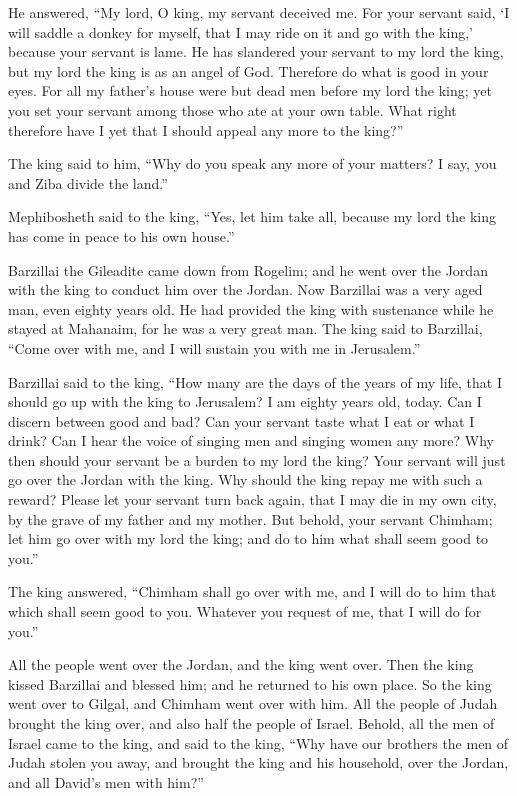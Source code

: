 \myverse{}He answered, “My lord, O king, my servant deceived me. For your
servant said, ‘I will saddle a donkey for myself, that I may ride on it and go with the king,’ because
your servant is lame.
\myverse{}He has slandered your servant to my lord the king, but my lord the king is
as an angel of God. Therefore do what is good in your eyes.
\myverse{}For all my father’s house were but dead men before my lord the king; yet
you set your servant among those who ate at your own table. What right therefore have I yet that I should
appeal any more to the king?”

\myverse{}The king said to him, “Why do you speak any more of your matters?
I say, you and Ziba divide the land.”

\myverse{}Mephibosheth said to the king, “Yes, let him take all, because
my lord the king has come in peace to his own house.”

\myverse{}Barzillai the Gileadite came down from Rogelim; and he went
over the Jordan with the king to conduct him over the Jordan.
\myverse{}Now Barzillai was a very aged man, even eighty years old. He had provided
the king with sustenance while he stayed at Mahanaim, for he was a very great man.
\myverse{}The king said to Barzillai, “Come over with me, and I will sustain you with
me in Jerusalem.”

\myverse{}Barzillai said to the king, “How many are the days of the years
of my life, that I should go up with the king to Jerusalem?
\myverse{}I am eighty years old, today. Can I discern between good and bad? Can your
servant taste what I eat or what I drink? Can I hear the voice of singing men and singing women any more?
Why then should your servant be a burden to my lord the king?
\myverse{}Your servant will just go over the Jordan with the king. Why should the king
repay me with such a reward?
\myverse{}Please let your servant turn back again, that I may die in my own city, by
the grave of my father and my mother. But behold, your servant Chimham; let him go over with my lord the
king; and do to him what shall seem good to you.”

\myverse{}The king answered, “Chimham shall go over with me, and I will
do to him that which shall seem good to you. Whatever you request of me, that I will do for you.”

\myverse{}All the people went over the Jordan, and the king went over.
Then the king kissed Barzillai and blessed him; and he returned to his own place.
\myverse{}So the king went over to Gilgal, and Chimham went over with him. All the
people of Judah brought the king over, and also half the people of Israel.
\myverse{}Behold, all the men of Israel came to the king, and said to the king, “Why
have our brothers the men of Judah stolen you away, and brought the king and his household, over the Jordan,
and all David’s men with him?”

